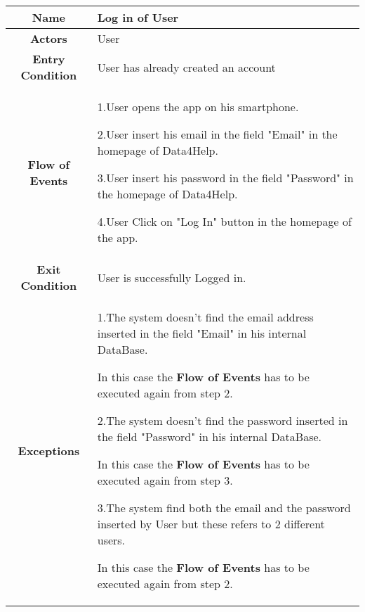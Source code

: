  \begin{table}[h!]
   \centering
    \begin{tabularx}{\linewidth}{|c|X|}
         \hline
         \textbf{Name} & Log in of User\\
	\hline
	\textbf{Actors} & User \\
	\hline
	\textbf{Entry Condition} & User has already created an account\\
	\hline
	\textbf{Flow of Events} & 1.User opens the app on his smartphone.

					2.User insert his email in the field "Email" in the homepage of Data4Help.

					3.User insert his password in the field "Password" in the homepage of Data4Help.

					4.User Click on "Log In" button in the homepage of the app.\\
	\hline
	\textbf{Exit Condition} & User is successfully Logged in. \\
	\hline
	\textbf{Exceptions} & 1.The system doesn't find the email address inserted in the field "Email" in his internal DataBase. 
				
				In this case the \textbf{Flow of Events} has to be executed again from step 2. 

				2.The system doesn't find the password inserted in the field "Password" in his internal DataBase.

				 In this case the \textbf{Flow of Events} has to be executed again from step 3. 

				3.The system find both the email and the password inserted by User but these refers to 2 different users.               

				In this case the \textbf{Flow of Events} has to be executed again from step 2. \\ 
        \hline
      \end{tabularx}
      \end{table}

